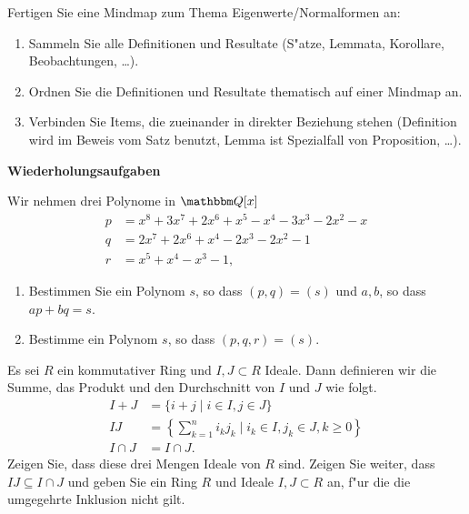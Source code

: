 \documentclass[a4,11pt]{article}
\begin{document}
\begin{aufgabe}[4 Quizbonuspunkte]
  Fertigen Sie eine Mindmap zum Thema
  Eigenwerte/Normalformen an:
  \begin{enumerate}
  \item Sammeln Sie alle Definitionen und Resultate (S"atze, Lemmata,
    Korollare, Beobachtungen, \ldots).
  \item Ordnen Sie die Definitionen und Resultate thematisch auf einer
    Mindmap an.
  \item Verbinden Sie Items, die zueinander in direkter Beziehung
    stehen (Definition wird im Beweis vom Satz benutzt, Lemma ist
    Spezialfall von Proposition, \ldots).
  \end{enumerate}
\end{aufgabe}



\newpage
\bigskip
{\Large \bfseries Wiederholungsaufgaben}
\bigskip

\begin{aufgabe}
Wir nehmen drei Polynome in $\Q[x]$
\begin{align*}
p &= x^8 + 3x^7 + 2x^6 + x^5 - x^4 - 3x^3 - 2x^2 - x\\
q &= 2x^7 + 2x^6 + x^4 - 2x^3 - 2x^2 - 1\\
r &= x^5 + x^4 - x^3 - 1,
\end{align*}
\begin{enumerate}
\item
  Bestimmen Sie ein Polynom $s$, so dass $(p,q) = (s)$
  und $a,b$, so dass $ap+bq=s$.
\item
  Bestimme ein Polynom $s$, so dass $(p,q,r) = (s)$.
 \end{enumerate}
\end{aufgabe}

\begin{aufgabe}

Es sei $R$ ein kommutativer Ring und $I, J \subset R$ Ideale. Dann
definieren wir die Summe, das Produkt und den Durchschnitt von $I$ und
$J$ wie folgt.
\begin{align*}
I + J &= \{ i + j \mid i \in I, j \in J \}\\
IJ &= \left\{ \sum_{k = 1}^n i_k j_k \mid i_k \in I, j_k \in J, k \geq 0 \right\}\\
I \cap J &= I \cap J.
\end{align*}
Zeigen Sie, dass diese drei Mengen Ideale von $R$ sind. Zeigen Sie
weiter, dass $IJ \subseteq I \cap J$ und geben Sie ein Ring $R$ und
Ideale $I, J \subset R$ an, f"ur die die umgegehrte Inklusion nicht gilt.  
\end{aufgabe}
\end{document}
